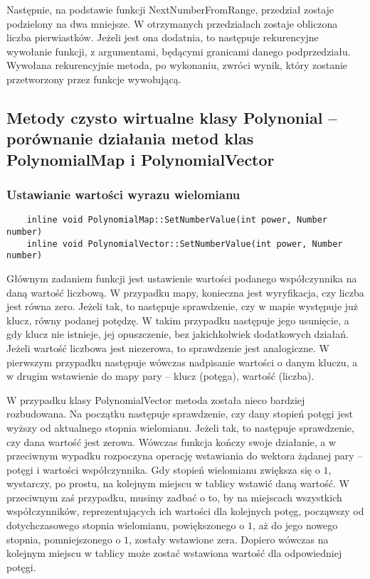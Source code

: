 \documentclass[oneside,a4paper]{book}
\begin{document}
	Następnie, na podstawie funkcji NextNumberFromRange, przedział zostaje podzielony na dwa mniejsze. W otrzymanych przedziałach zostaje obliczona liczba pierwiastków. Jeżeli jest ona dodatnia, to następuje rekurencyjne wywołanie funkcji, z argumentami, będącymi granicami danego podprzedziału. Wywołana rekurencyjnie metoda, po wykonaniu, zwróci wynik, który zostanie przetworzony przez funkcje wywołującą. 
	\\
	
	\subsection{Metody czysto wirtualne klasy Polynonial – porównanie działania metod klas PolynomialMap i PolynomialVector}
	
	\subsubsection{Ustawianie wartości wyrazu wielomianu}
	\begin{lstlisting}
	inline void PolynomialMap::SetNumberValue(int power, Number number)
	inline void PolynomialVector::SetNumberValue(int power, Number number)
	\end{lstlisting}
	
	Głównym zadaniem funkcji jest ustawienie wartości podanego współczynnika na daną wartość liczbową. W przypadku mapy, konieczna jest wyryfikacja, czy liczba jest równa zero. Jeżeli tak, to następuje sprawdzenie, czy w mapie występuje już klucz, równy podanej potędzę. W takim przypadku następuje jego usunięcie, a gdy klucz nie istnieje, jej opuszczenie, bez jakichkolwiek dodatkowych działań. Jeżeli wartość liczbowa jest niezerowa, to sprawdzenie jest analogiczne. W pierwszym przypadku następuje wówczas nadpisanie wartości o danym kluczu, a w drugim wstawienie do mapy pary – klucz (potęga), wartość (liczba).
	
	W przypadku klasy PolynomialVector metoda została nieco bardziej rozbudowana. Na początku następuje sprawdzenie, czy dany stopień potęgi jest wyższy od aktualnego stopnia wielomianu. Jeżeli tak, to następuje sprawdzenie, czy dana wartość jest zerowa. Wówczas funkcja kończy swoje działanie, a w przeciwnym wypadku rozpoczyna operację wstawiania do wektora żądanej pary – potęgi i wartości współczynnika. Gdy stopień wielomianu zwiększa się o $1$, wystarczy, po prostu, na kolejnym miejscu w tablicy wstawić daną wartość. W przeciwnym zaś przypadku, musimy zadbać o to, by na miejscach wszystkich współczynników, reprezentujących ich wartości dla kolejnych potęg, począwszy od dotychczasowego stopnia wielomianu, powiększonego o $1$, aż do jego nowego stopnia, pomniejszonego o $1$, zostały wstawione zera. Dopiero wówczas na kolejnym miejscu w tablicy może zostać wstawiona wartość dla odpowiedniej potęgi.
	
\end{document}
